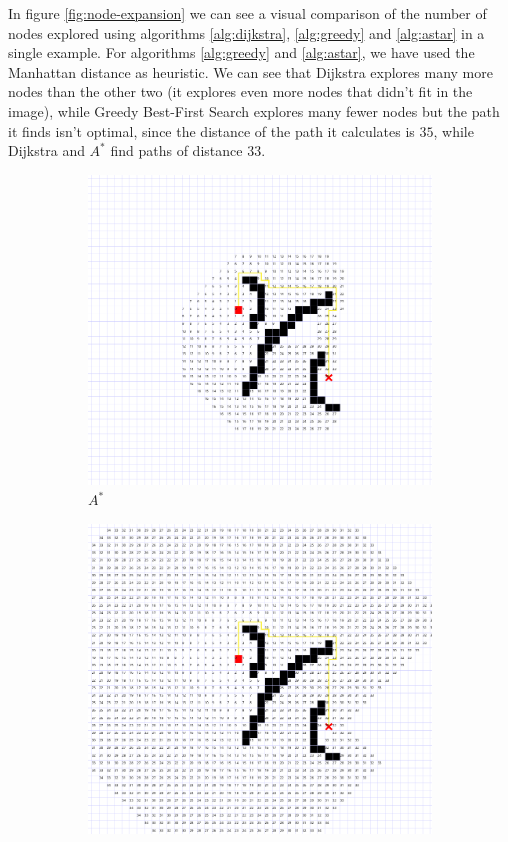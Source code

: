 \documentclass[a4paper,10pt]{report}
\begin{document}
In figure \ref{fig:node-expansion} we can see a visual comparison of the number of nodes explored using algorithms \ref{alg:dijkstra}, \ref{alg:greedy} and \ref{alg:astar} in a single example. For algorithms \ref{alg:greedy} and \ref{alg:astar}, we have used the Manhattan distance as heuristic. We can see that Dijkstra explores many more nodes than the other two (it explores even more nodes that didn't fit in the image), while Greedy Best-First Search explores many fewer nodes but the path it finds isn't optimal, since the distance of the path it calculates is $35$, while Dijkstra and $A^*$ find paths of distance $33$.

\begin{figure}
\centering
\begin{subfigure}[b]{0.45\textwidth}
	\includegraphics[width=1\linewidth]{astar-nodes}
	\caption{$A^*$}
\end{subfigure}
\begin{subfigure}[b]{0.45\textwidth}
	\includegraphics[width=1\linewidth]{dijkstra-nodes}

\end{subfigure}
\end{figure}
\end{document}

